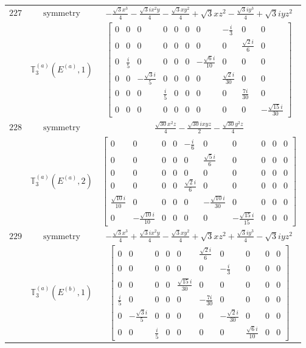 \documentclass[fleqn,8pt,landscape]{jsarticle}
\begin{document}
\begin{longtable}{ccc}
$ 227 $ & $ \text{symmetry} $ & $ - \frac{\sqrt{3} x^{3}}{4} - \frac{\sqrt{3} i x^{2} y}{4} - \frac{\sqrt{3} x y^{2}}{4} + \sqrt{3} x z^{2} - \frac{\sqrt{3} i y^{3}}{4} + \sqrt{3} i y z^{2} $ \\
$  $ & $ \mathbb{T}_{3}^{(a)}(E^{(a)},1) $ & $ \begin{bmatrix} 0 & 0 & 0 & 0 & 0 & 0 & 0 & - \frac{i}{3} & 0 & 0 \\ 0 & 0 & 0 & 0 & 0 & 0 & 0 & 0 & \frac{\sqrt{2} i}{6} & 0 \\ 0 & \frac{i}{5} & 0 & 0 & 0 & 0 & - \frac{\sqrt{6} i}{10} & 0 & 0 & 0 \\ 0 & 0 & - \frac{\sqrt{3} i}{5} & 0 & 0 & 0 & 0 & \frac{\sqrt{2} i}{30} & 0 & 0 \\ 0 & 0 & 0 & \frac{i}{5} & 0 & 0 & 0 & 0 & \frac{7 i}{30} & 0 \\ 0 & 0 & 0 & 0 & 0 & 0 & 0 & 0 & 0 & - \frac{\sqrt{15} i}{30} \end{bmatrix} $ \\ \hline
$ 228 $ & $ \text{symmetry} $ & $ \frac{\sqrt{30} x^{2} z}{4} - \frac{\sqrt{30} i x y z}{2} - \frac{\sqrt{30} y^{2} z}{4} $ \\
$  $ & $ \mathbb{T}_{3}^{(a)}(E^{(a)},2) $ & $ \begin{bmatrix} 0 & 0 & 0 & 0 & - \frac{i}{6} & 0 & 0 & 0 & 0 & 0 \\ 0 & 0 & 0 & 0 & 0 & \frac{\sqrt{5} i}{6} & 0 & 0 & 0 & 0 \\ 0 & 0 & 0 & 0 & 0 & 0 & 0 & 0 & 0 & 0 \\ 0 & 0 & 0 & 0 & \frac{\sqrt{2} i}{6} & 0 & 0 & 0 & 0 & 0 \\ \frac{\sqrt{10} i}{10} & 0 & 0 & 0 & 0 & - \frac{\sqrt{10} i}{30} & 0 & 0 & 0 & 0 \\ 0 & - \frac{\sqrt{10} i}{10} & 0 & 0 & 0 & 0 & - \frac{\sqrt{15} i}{15} & 0 & 0 & 0 \end{bmatrix} $ \\ \hline
$ 229 $ & $ \text{symmetry} $ & $ - \frac{\sqrt{3} x^{3}}{4} + \frac{\sqrt{3} i x^{2} y}{4} - \frac{\sqrt{3} x y^{2}}{4} + \sqrt{3} x z^{2} + \frac{\sqrt{3} i y^{3}}{4} - \sqrt{3} i y z^{2} $ \\
$  $ & $ \mathbb{T}_{3}^{(a)}(E^{(b)},1) $ & $ \begin{bmatrix} 0 & 0 & 0 & 0 & 0 & \frac{\sqrt{2} i}{6} & 0 & 0 & 0 & 0 \\ 0 & 0 & 0 & 0 & 0 & 0 & - \frac{i}{3} & 0 & 0 & 0 \\ 0 & 0 & 0 & 0 & \frac{\sqrt{15} i}{30} & 0 & 0 & 0 & 0 & 0 \\ \frac{i}{5} & 0 & 0 & 0 & 0 & - \frac{7 i}{30} & 0 & 0 & 0 & 0 \\ 0 & - \frac{\sqrt{3} i}{5} & 0 & 0 & 0 & 0 & - \frac{\sqrt{2} i}{30} & 0 & 0 & 0 \\ 0 & 0 & \frac{i}{5} & 0 & 0 & 0 & 0 & \frac{\sqrt{6} i}{10} & 0 & 0 \end{bmatrix} $ \\ \hline

\end{longtable}
\end{document}
